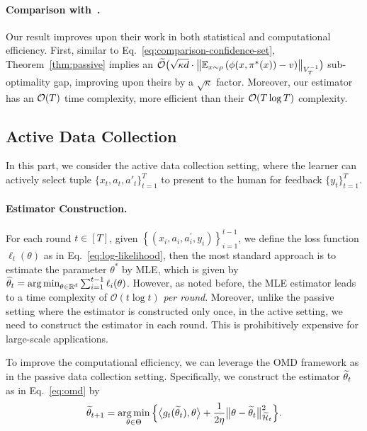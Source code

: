 \paragraph{Comparison with~\citet{ICML'23:Zhu-Principled}.} Our result improves upon their work in both statistical and computational efficiency. First, similar to Eq.~\eqref{eq:comparison-confidence-set}, Theorem~\ref{thm:passive} implies an $\Ot \big(\sqrt{\kappa d} \cdot \bignorm{\mathbb{E}_{x \sim \rho} \left(\phi(x,\pi^*(x))-v\right)}_{V_{T}^{-1}}\big)$ sub-optimality gap, improving upon theirs by a $\sqrt{\kappa}$ factor. Moreover, our estimator has an $\mathcal{O}(T)$ time complexity, more efficient than their $\mathcal{O}(T \log T)$ complexity.

\vspace{-1mm}
\subsection{Active Data Collection}
In this part, we consider the active data collection setting, where the learner can actively select tuple $\{x_t, a_t, a'_t\}_{t=1}^T$ to present to the human for feedback $\{y_t\}_{t=1}^T$. 

\paragraph{Estimator Construction.} For each round $t\in[T]$, given $\left\{\left(x_i, a_i, a_i^{\prime}, y_i\right)\right\}_{i=1}^{t-1}$, we define the loss function $\ell_t(\theta)$ as in Eq.~\eqref{eq:log-likelihood}, then the most standard approach is to estimate the parameter $\theta^*$ by MLE, which is given by $\widehat{\theta}_{t}=\operatorname*{arg\,min}_{\theta \in \mathbb{R}^d} \sum_{i=1}^{t-1} \ell_i(\theta)$. However, as noted before, the MLE estimator leads to a time complexity of $\mathcal{O}(t \log t)$ \emph{per round}. Moreover, unlike the passive setting where the estimator is constructed only once, in the active setting, we need to construct the estimator in each round. This is prohibitively expensive for large-scale applications.

To improve the computational efficiency, we can leverage the OMD framework as in the passive data collection setting. Specifically, we construct the estimator $\widetilde{\theta}_t$ as in Eq.~\eqref{eq:omd} by
\begin{align}
  \label{eq:omd-active}
  \widetilde{\theta}_{t+1}=\operatorname*{arg\,min}_{\theta \in \Theta} \Big\{\big\langle g_t(\widetilde{\theta}_t), \theta \big\rangle +\frac{1}{2 \eta}\big\|\theta-\widetilde{\theta}_t\big\|_{\widetilde{\mathcal{H}}_t}^2\Big\}.
\end{align}

